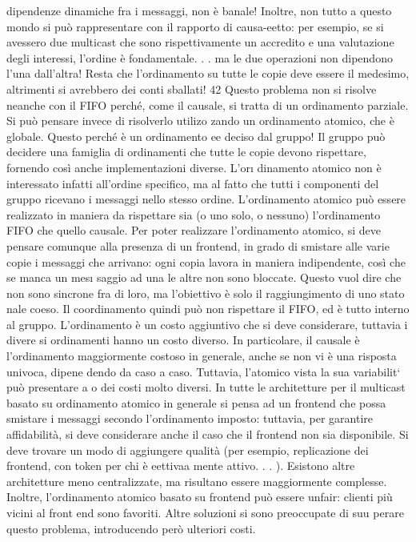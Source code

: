 dipendenze dinamiche fra i messaggi, non è banale!
Inoltre, non tutto a questo mondo si può rappresentare con il rapporto di
causa-eetto: per esempio, se si avessero due multicast che sono rispettivamente
un accredito e una valutazione degli interessi, l'ordine è fondamentale. . . ma le
due operazioni non dipendono l'una dall'altra! Resta che l'ordinamento su tutte
le copie deve essere il medesimo, altrimenti si avrebbero dei conti sballati!
42
Questo problema non si risolve neanche con il FIFO perché, come il causale,
si tratta di un ordinamento parziale. Si può pensare invece di risolverlo utilizo
zando un ordinamento atomico, che è globale. Questo perché è un ordinamento
ee
deciso dal gruppo! Il gruppo può decidere una famiglia di ordinamenti che tutte
le copie devono rispettare, fornendo così anche implementazioni diverse. L'or\i{}
dinamento atomico non è interessato infatti all'ordine specifico, ma al fatto che
tutti i componenti del gruppo ricevano i messaggi nello stesso ordine. L'ordinamento atomico può essere realizzato in
maniera da rispettare sia (o uno solo, o
nessuno) l'ordinamento FIFO che quello causale.
Per poter realizzare l'ordinamento atomico, si deve pensare comunque alla
presenza di un frontend, in grado di smistare alle varie copie i messaggi che
arrivano: ogni copia lavora in maniera indipendente, così che se manca un mes\i{}
saggio ad una le altre non sono bloccate. Questo vuol dire che non sono sincrone
fra di loro, ma l'obiettivo è solo il raggiungimento di uno stato nale coeso. Il
coordinamento quindi può non rispettare il FIFO, ed è tutto interno al gruppo.
L'ordinamento è un costo aggiuntivo che si deve considerare, tuttavia i divere
si ordinamenti hanno un costo diverso. In particolare, il causale è l'ordinamento
maggiormente costoso in generale, anche se non vi è una risposta univoca, dipene
dendo da caso a caso. Tuttavia, l'atomico vista la sua variabilit` può presentare
a o
dei costi molto diversi.
In tutte le architetture per il multicast basato su ordinamento atomico in
generale si pensa ad un frontend che possa smistare i messaggi secondo l'ordinamento imposto: tuttavia, per garantire
affidabilità, si deve considerare anche il
caso che il frontend non sia disponibile. Si deve trovare un modo di aggiungere
qualità (per esempio, replicazione dei frontend, con token per chi è eettivaa
mente attivo. . . ). Esistono altre architetture meno centralizzate, ma risultano
essere maggiormente complesse.
Inoltre, l'ordinamento atomico basato su frontend può essere unfair: clienti
più vicini al front end sono favoriti. Altre soluzioni si sono preoccupate di suu
perare questo problema, introducendo però ulteriori costi.
